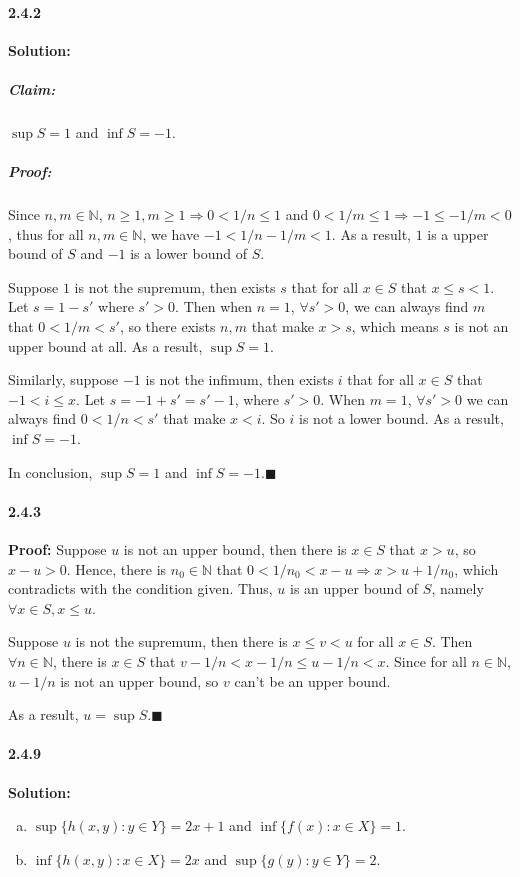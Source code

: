 \documentclass[11pt]{article}
\begin{document}
	\paragraph{2.4.2}\textbf{Solution:}
		\subparagraph{Claim:}$\sup S = 1$ and $\inf S = -1$.
		\subparagraph{Proof:}
			Since $n, m\in \mathbb{N}$, $n \geq 1, m \geq 1 \Rightarrow 0 < 1 / n \leq 1$ and $0 < 1 / m \leq 1 \Rightarrow -1 \leq -1/m < 0$, thus for all $n, m \in \mathbb{N}$, we have $-1 < 1/n - 1/m < 1$. As a result, $1$ is a upper bound of $S$ and $-1$ is a lower bound of $S$.
			
			Suppose $1$ is not the supremum, then exists $s$ that for all $x \in S$ that $x \leq s < 1$. Let $s = 1 - s'$ where $s' > 0$. Then when $n = 1$, $\forall s' > 0$, we can always find $m$ that $0 < 1/m < s'$, so there exists $n, m$ that make $x > s$, which means $s$ is not an upper bound at all. As a result, $\sup S = 1$.
			
			Similarly, suppose $-1$ is not the infimum, then exists $i$ that for all $x \in S$ that $-1 < i \leq x$. Let $s = -1 + s' = s' - 1$, where $s' > 0$. When $m = 1$, $\forall s' > 0$ we can always find $0 < 1/n < s'$ that make $x < i$. So $i$ is not a lower bound.  As a result, $\inf S = -1$.
			
			In conclusion, $\sup S = 1$ and $\inf S = -1$.$\blacksquare$
	\paragraph{2.4.3}\textbf{Proof:}
		Suppose $u$ is not an upper bound, then there is $x \in S$ that $x > u$, so $x - u > 0$. Hence, there is $n_0 \in \mathbb{N}$ that $0 < 1 / n_0 < x - u \Rightarrow x > u + 1 / n_0$, which contradicts with the condition given. Thus, $u$ is an upper bound of $S$, namely $\forall x \in S, x \leq u$.
		
		Suppose $u$ is not the supremum, then there is $x \leq v < u$ for all $x \in S$. Then $\forall n \in \mathbb{N}$, there is $x \in S$ that $v - 1/n < x - 1/n \leq u - 1/n < x$. Since for all $n \in \mathbb{N}$, $u - 1/n$ is not an upper bound, so $v$ can't be an upper bound.
		
		As a result, $u = \sup S$.$\blacksquare$
	\paragraph{2.4.9}\textbf{Solution:}
		\begin{enumerate}[(a)]
			\item $\sup \{h(x,y): y \in Y\} = 2x + 1$ and $\inf\{f(x) : x \in X\} = 1$.
			\item $\inf \{h(x,y): x \in X\} = 2x$ and $\sup\{g(y): y \in Y\} = 2$.
		\end{enumerate}
\end{document}
